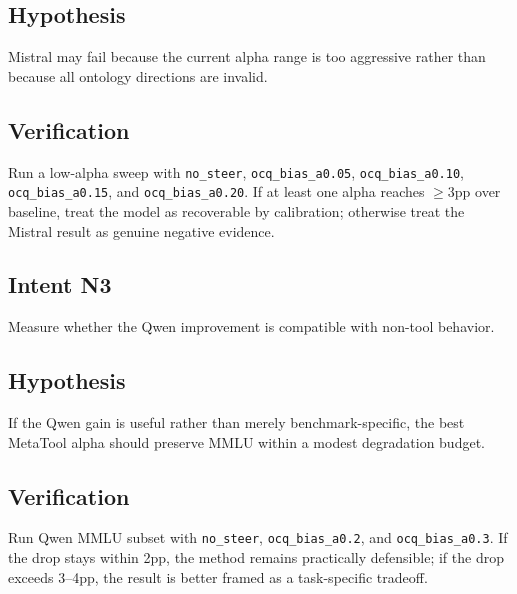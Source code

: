 \documentclass[11pt,a4paper]{article}
\begin{document}
\subsection*{Hypothesis}
Mistral may fail because the current alpha range is too aggressive rather than
because all ontology directions are invalid.

\subsection*{Verification}
Run a low-alpha sweep with \texttt{no\_steer},
\texttt{ocq\_bias\_a0.05}, \texttt{ocq\_bias\_a0.10},
\texttt{ocq\_bias\_a0.15}, and \texttt{ocq\_bias\_a0.20}. If at least one
alpha reaches \(\ge 3\)pp over baseline, treat the model as recoverable by
calibration; otherwise treat the Mistral result as genuine negative evidence.

\subsection*{Intent N3}
Measure whether the Qwen improvement is compatible with non-tool behavior.

\subsection*{Hypothesis}
If the Qwen gain is useful rather than merely benchmark-specific, the best
MetaTool alpha should preserve MMLU within a modest degradation budget.

\subsection*{Verification}
Run Qwen MMLU subset with \texttt{no\_steer}, \texttt{ocq\_bias\_a0.2}, and
\texttt{ocq\_bias\_a0.3}. If the drop stays within 2pp, the method remains
practically defensible; if the drop exceeds 3--4pp, the result is better framed
as a task-specific tradeoff.
\end{document}
